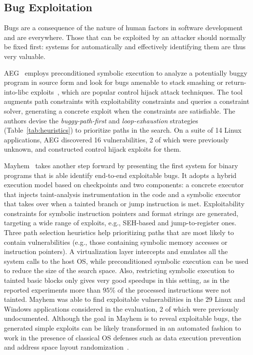
\subsection{Bug Exploitation}
\label{ss:bug-exploitation}
Bugs are a consequence of the nature of human factors in software development and are everywhere. Those that can be exploited by an attacker should normally be fixed first: systems for automatically and effectively identifying them are thus very valuable.

{\sc AEG}~\cite{AEG-NDSS11} employs preconditioned symbolic execution to analyze a potentially buggy program in source form and look for bugs amenable to stack smashing or return-into-libc exploits~\cite{PB-SSP04}, which are popular control hijack attack techniques. The tool augments path constraints with exploitability constraints and queries a constraint solver, generating a concrete exploit when the constraints are satisfiable. The authors devise the {\em buggy-path-first} and {\em loop-exhaustion} strategies (Table~\ref{tab:heuristics}) to prioritize paths in the search. On a suite of 14 Linux applications, {\sc AEG} discovered 16 vulnerabilities, 2 of which were previously unknown, and constructed control hijack exploits for them.

{\sc Mayhem}~\cite{MAYHEM-SP12} takes another step forward by presenting the first system for binary programs that is able identify end-to-end exploitable bugs. It adopts a hybrid execution model based on checkpoints and two components: a concrete executor that injects taint-analysis instrumentation in the code and a symbolic executor that takes over when a tainted branch or jump instruction is met. Exploitability constraints for symbolic instruction pointers and format strings are generated, targeting a wide range of exploits, e.g., SEH-based and jump-to-register ones. Three path selection heuristics help prioritizing paths that are most likely to contain vulnerabilities (e.g., those containing symbolic memory accesses or instruction pointers). A virtualization layer intercepts and emulates all the system calls to the host OS, while preconditioned symbolic execution can be used to reduce the size of the search space. Also, restricting symbolic execution to tainted basic blocks only gives very good speedups in this setting, as in the reported experiments more than $95\%$ of the processed instructions were not tainted. {\sc Mayhem} was able to find exploitable vulnerabilities in the 29 Linux and Windows applications considered in the evaluation, 2 of which were previously undocumented. Although the goal in {\sc Mayhem} is to reveal exploitable bugs, the generated simple exploits can be likely transformed in an automated fashion to work in the presence of classical OS defenses such as data execution prevention and address space layout randomization~\cite{Q-SEC11}. 

